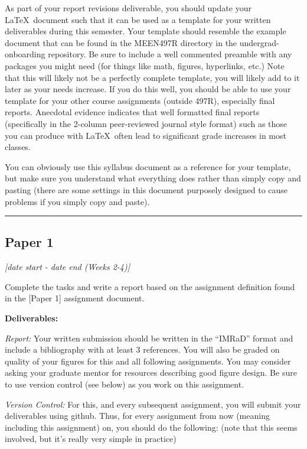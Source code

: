 \documentclass[12pt]{article}
\begin{document}
As part of your report revisions deliverable, you should update your \LaTeX~document such that it can be used as a template for your written deliverables during this semester.
Your template should resemble the example document that can be found in the MEEN497R directory in the undergrad-onboarding repository.
Be sure to include a well commented preamble with any packages you might need (for things like math, figures, hyperlinks, etc.)
Note that this will likely not be a perfectly complete template, you will likely add to it later as your needs increase.  If you do this well, you should be able to use your template for your other course assignments (outside 497R), especially final reports.  Anecdotal evidence indicates that well formatted final reports (specifically in the 2-column peer-reviewed journal style format) such as those you can produce with \LaTeX~often lead to significant grade increases in most classes.

You can obviously use this syllabus document as a reference for your template, but make sure you understand what everything does rather than simply copy and pasting (there are some settings in this document purposely designed to cause problems if you simply copy and paste).



\vspace{1em}\hrule\vspace{1em}
\subsection{Paper 1}
\label{ssec:p1}
\textit{[date start - date end (Weeks 2-4)]}

\bigskip


Complete the tasks and write a report based on the assignment definition found in the [Paper 1] assignment document.

\bigskip


\noindent \textbf{Deliverables:}

\textit{Report:} Your written submission should be written in the ``IMRaD'' format and include a bibliography with at least 3 references. 
You will also be graded on quality of your figures for this and all following assignments.
You may consider asking your graduate mentor for resources describing good figure design.
Be sure to use version control (see below) as you work on this assignment.

\textit{Version Control:}
For this, and every subsequent assignment, you will submit your deliverables using github.  Thus, for every assignment from now (meaning including this assignment) on, you should do the following: (note that this seems involved, but it's really very simple in practice)
\end{document}
